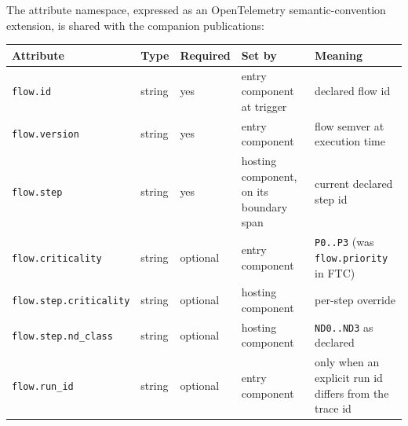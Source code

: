\documentclass[11pt]{article}
\newcommand{\code}[1]{\texttt{#1}}
\begin{document}
The attribute namespace, expressed as an OpenTelemetry semantic-convention extension, is shared with the companion publications:

\begin{center}
\footnotesize
\begin{tabular}{@{}p{4.4cm} l l p{3.4cm} p{4.2cm}@{}}
\toprule
\textbf{Attribute} & \textbf{Type} & \textbf{Required} & \textbf{Set by} & \textbf{Meaning} \\
\midrule
\code{flow.id} & string & yes & entry component at trigger & declared flow id \\
\code{flow.version} & string & yes & entry component & flow semver at execution time \\
\code{flow.step} & string & yes & hosting component, on its boundary span & current declared step id \\
\code{flow.criticality} & string & optional & entry component & \code{P0..P3} (was \code{flow.priority} in FTC) \\
\code{flow.step.criticality} & string & optional & hosting component & per-step override \\
\code{flow.step.nd\_class} & string & optional & hosting component & \code{ND0..ND3} as declared \\
\code{flow.run\_id} & string & optional & entry component & only when an explicit run id differs from the trace id \\
\bottomrule
\end{tabular}
\end{center}
\end{document}
